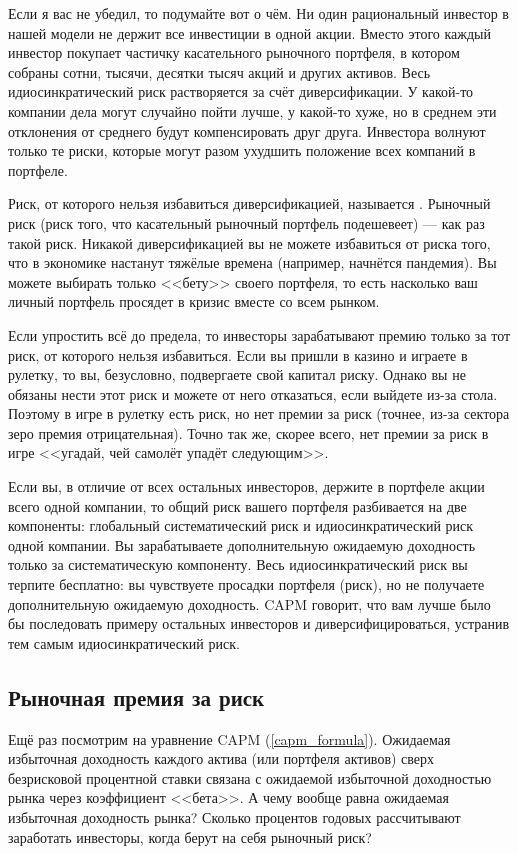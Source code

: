 Если я вас не убедил, то подумайте вот о чём. Ни один рациональный инвестор в 
нашей модели не держит все инвестиции в одной акции. Вместо этого каждый 
инвестор покупает частичку касательного рыночного портфеля, в котором собраны 
сотни, тысячи, десятки тысяч акций и других активов. Весь идиосинкратический 
риск растворяется за счёт диверсификации. У какой-то компании дела могут 
случайно пойти лучше, у какой-то хуже, но в среднем эти отклонения от среднего 
будут компенсировать друг друга. Инвестора волнуют только те риски, которые 
могут разом ухудшить положение всех компаний в портфеле.

Риск, от которого нельзя избавиться диверсификацией, называется 
. Рыночный риск (риск того, что касательный 
рыночный портфель подешевеет) --- как раз такой риск. Никакой диверсификацией вы 
не можете избавиться от риска того, что в экономике настанут тяжёлые времена 
(например, начнётся пандемия). Вы можете выбирать только <<бету>> своего 
портфеля, то есть насколько ваш личный портфель просядет в кризис вместе со всем 
рынком.

Если упростить всё до предела, то инвесторы зарабатывают премию только за тот 
риск, от которого нельзя избавиться. Если вы пришли в казино и играете в 
рулетку, то вы, безусловно, подвергаете свой капитал риску. Однако вы не 
обязаны нести этот риск и можете от него отказаться, если выйдете из-за стола. 
Поэтому в игре в рулетку есть риск, но нет премии за риск (точнее, из-за сектора 
зеро премия отрицательная). Точно так же, скорее всего, нет премии за риск в 
игре <<угадай, чей самолёт упадёт следующим>>.

Если вы, в отличие от всех остальных инвесторов, держите в портфеле акции всего 
одной компании, то общий риск вашего портфеля разбивается на две компоненты:
глобальный систематический риск и идиосинкратический риск одной компании. Вы 
зарабатываете дополнительную ожидаемую доходность только за систематическую 
компоненту. Весь идиосинкратический риск вы терпите бесплатно: вы чувствуете 
просадки портфеля (риск), но не получаете дополнительную ожидаемую доходность. 
CAPM говорит, что вам лучше было бы последовать примеру остальных инвесторов и 
диверсифицироваться, устранив тем самым идиосинкратический риск.

\subsection{Рыночная премия за риск}

Ещё раз посмотрим на уравнение CAPM (\ref{capm_formula}). Ожидаемая избыточная 
доходность каждого актива (или портфеля активов) сверх безрисковой процентной 
ставки связана с ожидаемой избыточной доходностью рынка через коэффициент 
<<бета>>. А чему вообще равна ожидаемая избыточная доходность рынка? Сколько 
процентов годовых рассчитывают заработать инвесторы, когда берут на себя 
рыночный риск?

